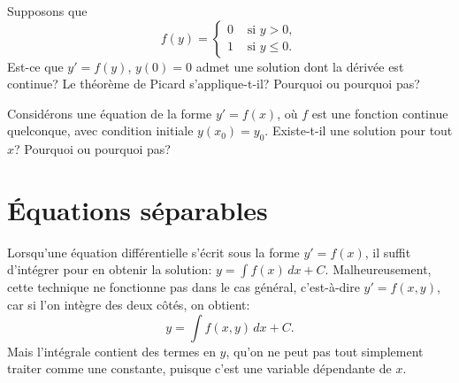 \begin{exercise}[défi]
	Supposons que
	\begin{equation*}
		f(y) = \begin{cases}
				0 & \text{ si $y > 0$}, \\
				1 & \text{ si $y \leq 0$} .
				\end{cases}
	\end{equation*}
	Est-ce que $y' = f(y)$, $y(0) = 0$ admet une solution dont la dérivée est continue?
	Le théorème de Picard s'applique-t-il?  Pourquoi ou pourquoi pas?
\end{exercise}

\begin{exercise}
	Considérons une équation de la forme $y' = f(x)$, où $f$ est une fonction continue quelconque,
	avec condition initiale $y(x_0) = y_0$.  Existe-t-il une solution pour tout $x$?  Pourquoi ou pourquoi pas?
\end{exercise}


\sectionnewpage
\section{Équations séparables}
\label{separable:section}


Lorsqu'une équation différentielle s'écrit sous la forme
$y' = f(x)$,
il suffit d'intégrer pour en obtenir la solution:
$y = \int f(x) \,dx + C$.
Malheureusement, cette technique ne fonctionne pas dans le cas général, c'est-à-dire
$y' = f(x , y)$, 
car si l'on intègre des deux côtés, on obtient:
\begin{equation*}
	y = \int f(x,y) \,dx + C .
\end{equation*}
Mais l'intégrale contient des termes en $y$, qu'on ne peut pas tout simplement \og{}traiter comme une constante\fg{}, puisque c'est une variable dépendante de $x$.


